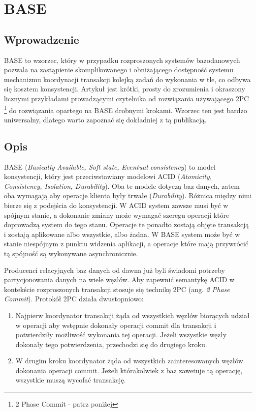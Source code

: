 \section{BASE}

\subsection*{Wprowadzenie}

BASE to wzorzec, który w przypadku rozproszonych systemów bazodanowych pozwala na zastąpienie skomplikowanego i obniżającego dostępność systemu mechanizmu koordynacji transakcji kolejką zadań do wykonania w tle, co odbywa się kosztem konsystencji.
Artykuł \cite{base-an-acid-alternative} jest krótki, prosty do zrozumienia i okraszony licznymi przykładami prowadzącymi czytelnika od rozwiązania używającego 2PC \footnote{2 Phase Commit - patrz poniżej} do rozwiązania opartego na BASE drobnymi krokami.
Wzorzec ten jest bardzo uniwersalny, dlatego warto zapoznać się dokładniej z tą publikacją.

\subsection*{Opis}

BASE (\emph{Basically Available, Soft state, Eventual consistency}) to model konsystencji, który jest przeciwstawiany modelowi ACID (\emph{Atomicity, Consistency, Isolation, Durability}). 
Oba te modele dotyczą baz danych, zatem oba wymagają aby operacje klienta były trwałe (\emph{Durability}).
Różnica między nimi bierze się z podejścia do konsystencji.
W ACID system zawsze musi być w spójnym stanie, a dokonanie zmiany może wymagać szeregu operacji które doprowadzą system do tego stanu.
Operacje te ponadto zostają objęte transakcją i zostają aplikowane albo wszystkie, albo żadna.
W BASE system może być w stanie niespójnym z punktu widzenia aplikacji, a operacje które mają przywrócić tą spójność są wykonywane asynchronicznie.

Producenci relacyjnych baz danych od dawna już byli świadomi potrzeby partycjonowania danych na wiele węzłów.
Aby zapewnić semantykę ACID w kontekście rozproszonych transakcji stosuje się technikę 2PC (ang. \emph{2 Phase Commit}).
Protokół 2PC działa dwustopniowo:

\begin{enumerate}
 \item Najpierw koordynator transakcji żąda od wszystkich węzłów biorących udział w operacji aby wstępnie dokonały operacji commit dla transakcji i potwierdziły możliwość wykonania tej operacji.
 Jeżeli wszystkie węzły dokonały tego potwierdzenia, przechodzi się do drugiego kroku.
 \item W drugim kroku koordynator żąda od wszystkich zainteresowanych węzłów dokonania operacji commit.
 Jeżeli którakolwiek z baz zawetuje tą operację, wszystkie muszą wycofać transakcję.
\end{enumerate}

